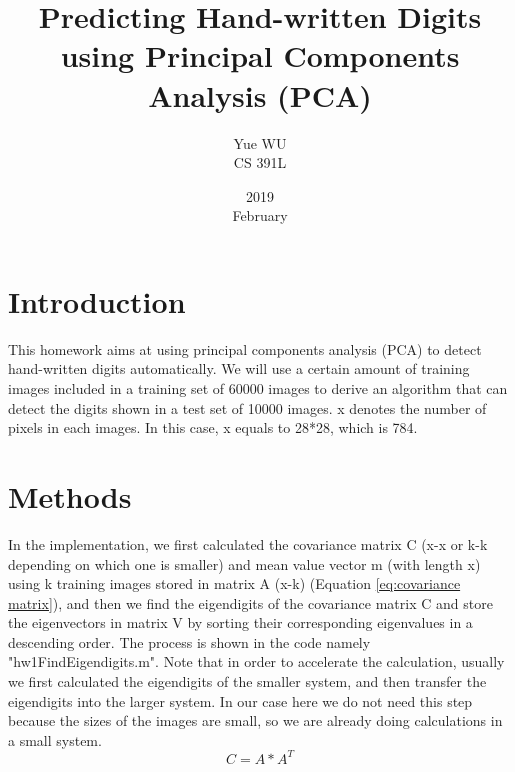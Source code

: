 \documentclass[UTF8,12pt]{article}
\title{Predicting Hand-written Digits using Principal Components Analysis (PCA)}
\date{2019\\ February}
\author{Yue WU\\ CS 391L}
\begin{document}
	\maketitle
	\section{Introduction}
	This homework aims at using principal components analysis (PCA) to detect hand-written digits automatically. We will use a certain amount of training images included in a training set of 60000 images to derive an algorithm that can detect the digits shown in a test set of 10000 images. x denotes the number of pixels in each images. In this case, x equals to 28*28, which is 784.
	\section{Methods}
	In the implementation, we first calculated the covariance matrix C (x-x or k-k depending on which one is smaller) and mean value vector m (with length x) using k training images stored in matrix A (x-k) (Equation \ref{eq:covariance matrix}), and then we find the eigendigits of the covariance matrix C and store the eigenvectors in matrix V by sorting their corresponding eigenvalues in a descending order. The process is shown in the code namely "hw1FindEigendigits.m". Note that in order to accelerate the calculation, usually we first calculated the eigendigits of the smaller system, and then transfer the eigendigits into the larger system. In our case here we do not need this step because the sizes of the images are small, so we are already doing calculations in a small system.
	\begin{equation}
	\label{eq:covariance matrix}
	C = A*A^{T}
	\end{equation}
	
\end{document}
